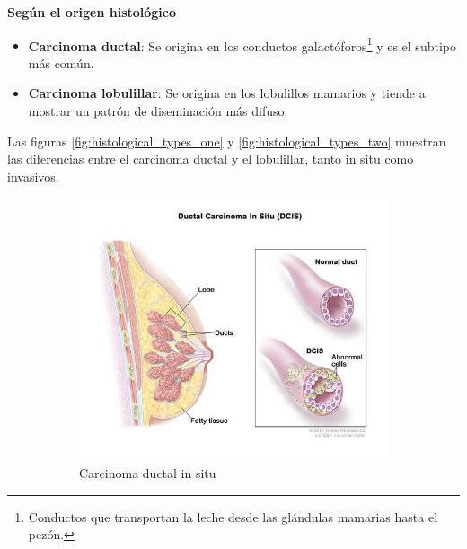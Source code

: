 \documentclass[a4paper,10pt]{book}
\begin{document}
\textbf{Según el origen histológico}
\begin{itemize}
\item \textbf{Carcinoma ductal}: Se origina en los conductos galactóforos\footnote{Conductos que transportan la leche desde las glándulas mamarias hasta el pezón.} y es el subtipo más común.
\item \textbf{Carcinoma lobulillar}: Se origina en los lobulillos mamarios y tiende a mostrar un patrón de diseminación más difuso.
\end{itemize}

Las figuras \ref{fig:histological_types_one} y \ref{fig:histological_types_two} muestran las diferencias entre el carcinoma ductal y el lobulillar, tanto in situ como invasivos.

\begin{figure}[h!]
	\centering
	\begin{subfigure}[c]{0.48\textwidth}
		\centering
		\includegraphics[width=\textwidth]{reports/assets/dcis.jpg}
		\caption{Carcinoma ductal in situ}
		\label{fig:dcis}
	\end{subfigure}
	\begin{subfigure}[c]{0.48\textwidth}
		\centering

\end{subfigure}
\end{figure}
\end{document}
